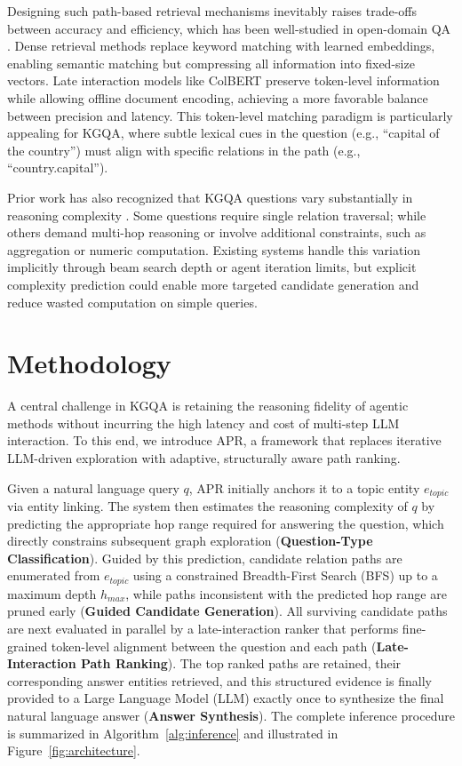 \documentclass[conference]{IEEEtran}
\newcommand{\model}{\textsc{APR}}
\begin{document}
Designing such path-based retrieval mechanisms inevitably raises trade-offs between accuracy and efficiency, which has been well-studied in open-domain QA \cite{gao2021densesurvey}. Dense retrieval methods \cite{karpukhin2020dpr, izacard2022contriever} replace keyword matching with learned embeddings, enabling semantic matching but compressing all information into fixed-size vectors. Late interaction models like ColBERT \cite{khattab2020colbert, santhanam2022colbertv2} preserve token-level information while allowing offline document encoding, achieving a more favorable balance between precision and latency. This token-level matching paradigm is particularly appealing for KGQA, where subtle lexical cues in the question (e.g., “capital of the country”) must align with specific relations in the path (e.g., “country.capital”).

Prior work has also recognized that KGQA questions vary substantially in reasoning complexity \cite{gu2021beyond, cao2022kqa}. Some questions require single relation traversal; while others demand multi-hop reasoning or involve additional constraints, such as aggregation or numeric computation. Existing systems handle this variation implicitly through beam search depth or agent iteration limits, but explicit complexity prediction could enable more targeted candidate generation and reduce wasted computation on simple queries.

\section{Methodology}
\label{sec:methodology}

A central challenge in KGQA is retaining the reasoning fidelity of agentic methods without incurring the high latency and cost of multi-step LLM interaction. To this end, we introduce \model{}, a framework that replaces iterative LLM-driven exploration with adaptive, structurally aware path ranking. 

Given a natural language query $q$, APR initially anchors it to a topic entity $e_{topic}$ via entity linking. The system then estimates the reasoning complexity of $q$ by predicting the appropriate hop range required for answering the question, which directly constrains subsequent graph exploration (\textbf{Question-Type Classification}). Guided by this prediction, candidate relation paths are enumerated from $e_{topic}$ using a constrained Breadth-First Search (BFS) up to a maximum depth $h_{max}$, while paths inconsistent with the predicted hop range are pruned early (\textbf{Guided Candidate Generation}). All surviving candidate paths are next evaluated in parallel by a late-interaction ranker that performs fine-grained token-level alignment between the question and each path (\textbf{Late-Interaction Path Ranking}). The top ranked paths are retained, their corresponding answer entities retrieved, and this structured evidence is finally provided to a Large Language Model (LLM) exactly once to synthesize the final natural language answer (\textbf{Answer Synthesis}). The complete inference procedure is summarized in Algorithm~\ref{alg:inference} and illustrated in Figure~\ref{fig:architecture}.
\end{document}
